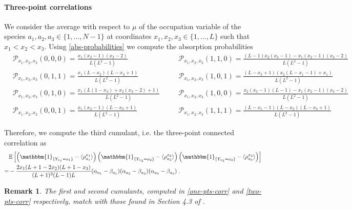 \documentclass[10pt]{article}
\numberwithin{equation}{section}
\numberwithin{equation}{subsection}
\newtheorem{remark}{Remark}
\newcommand{\dt}{\;.}
\begin{document}
\paragraph{Three-point correlations}
We consider the average with respect to $\mu$ of the occupation variable of the species  $a_{1},a_{2},a_{3}\in \{1,\ldots,N-1\}$ at coordinates $x_{1},x_{2},x_{3}\in \{1,\ldots,L\}$ such that $x_{1}<x_{2}<x_{3}$. Using \eqref{abs-probabilities} we compute the absorption probabilities 
\begin{equation}
	\begin{split}
	&\mathcal{P}_{x_{1},x_{2},x_{3}}(0,0,0)=\frac{x_{1}(x_{2}-1)(x_{3}-2)}{L(L^{2}-1)}\\
 &\mathcal{P}_{x_{1},x_{2},x_{3}}(0,1,1)=\frac{x_1 (L-x_2) (L-x_3+1)}{L \left(L^2-1\right)}\\
	&\mathcal{P}_{x_{1},x_{2},x_{3}}(0,1,0)=\frac{x_1 (L(1-x_3)+x_2 (x_3-2)+1)}{L(L^2-1)}\\
	&\mathcal{P}_{x_{1},x_{2},x_{3}}(0,0,1)=\frac{x_1 (x_2-1) (L-x_3+1)}{L \left(L^2-1\right)}
	\end{split}\quad \begin{split}
	&\mathcal{P}_{x_{1},x_{2},x_{3}}(1,1,0)=\frac{(L-1) x_2 (x_3-1)-x_1 (x_2-1)
		(x_3-2)}{L \left(L^2-1\right)}\\
	&\mathcal{P}_{x_{1},x_{2},x_{3}}(1,0,1)=\frac{(L-x_3+1) (x_2 (L-x_1-1)+x_1)}{L
		\left(L^2-1\right)}\\
	&\mathcal{P}_{x_{1},x_{2},x_{3}}(1,0,0)=\frac{ x_{2} (x_3-1)(L-1)-x_1 (x_2-1)
	(x_3-2)}{L \left(L^2-1\right)}\\
	&\mathcal{P}_{x_{1},x_{2},x_{3}}(1,1,1)=\frac{(L-x_{1}-1)(L-x_{2})(L-x_{3}+1)}{L(L^{2}-1)}
\end{split}
\end{equation}

Therefore, we compute the third cumulant, i.e. the three-point connected correlation as 
\begin{align}
	&\mathbb{E}\left[\left(\mathbbm{1}_{\{Y_{x_{1}}=a_{1}\}}-\langle\rho_{a_{1}}^{x_{1}}\rangle \right)\left(\mathbbm{1}_{\{Y_{x_{2}}=a_{2}\}}-\langle\rho_{a_{2}}^{x_{2}}\rangle \right)\left(\mathbbm{1}_{\{Y_{x_{3}}=a_{3}\}}-\langle\rho_{a_{3}}^{x_{3}}\rangle \right)\right]\nonumber\\
	=&-\frac{2x_{1}(L+1-2x_{2})(L+1-x_{3})}{(L+1)^{3}(L-1)L}(\alpha_{a_{1}}-\beta_{a_{1}})(\alpha_{a_{2}}-\beta_{a_{2}})(\alpha_{a_{3}}-\beta_{a_{3}})\dt
\end{align} 
\begin{remark} The first and second cumulants, computed in \eqref{one-pts-corr} and \eqref{two-pts-corr} respectively, match with those found in Section 4.3 of \cite{vanicat2017exact}.
	\end{remark}
\end{document}
